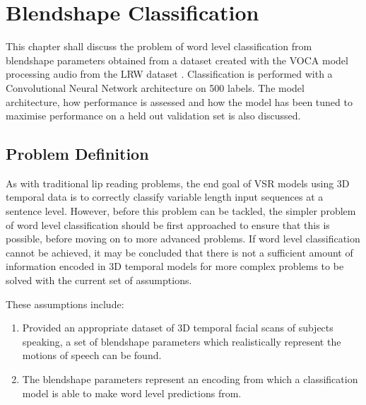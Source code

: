 %
%
%
%
%





\chapter{Blendshape Classification}

This chapter shall discuss the problem of word level classification from blendshape parameters obtained from a dataset created with the VOCA model \cite{Cudeiro2019} processing audio from the LRW dataset \cite{Chung2016}.
Classification is performed with a Convolutional Neural Network architecture on 500 labels.
The model architecture, how performance is assessed and how the model has been tuned to maximise performance on a held out validation set is also discussed. 

\section{Problem Definition}
As with traditional lip reading problems, the end goal of VSR models using 3D temporal data is to correctly classify variable length input sequences at a sentence level.
However, before this problem can be tackled, the simpler problem of word level classification should be first approached to ensure that this is possible, before moving on to more advanced problems.
If word level classification cannot be achieved, it may be concluded that there is not a sufficient amount of information encoded in 3D temporal models for more complex problems to be solved with the current set of assumptions.

These assumptions include:
\begin{enumerate}
    \item Provided an appropriate dataset of 3D temporal facial scans of subjects speaking, a set of blendshape parameters which realistically represent the motions of speech can be found. \label{assumption:class_1}
    \item The blendshape parameters represent an encoding from which a classification model is able to make word level predictions from. \label{assumption:class_2}
\end{enumerate}

